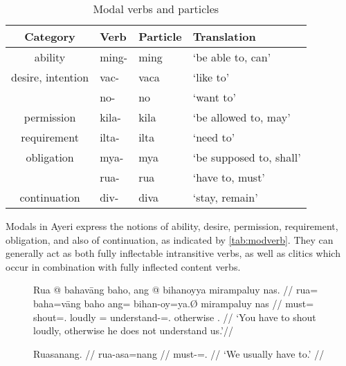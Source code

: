 \begin{table}
\caption{Modal verbs and particles}
\begin{tabu} to \linewidth {C[3] I[2] I[2] X[4]}
\tableheaderfont\toprule
Category
	& Verb
	& Particle
	& Translation
	\\
\toprule

ability
	& ming- %
	& ming %
	& `be able to, can'
	\\
	
\midrule
	
desire, intention
	& vac- %
	& vaca %
	& `like to'
	\\
	
	& no- %
	& no %
	& `want to'
	\\
	
\midrule

permission
	& kila- %
	& kila %
	& `be allowed to, may'
	\\
	
\midrule

requirement
	& ilta- %
	& ilta %
	& `need to'
	\\
	
\midrule

obligation
	& mya- %
	& mya %
	& `be supposed to, shall'
	\\
	
	& rua- %
	& rua %
	& `have to, must'
	\\
	
\midrule
	
continuation
	& div- %
	& diva %
	& `stay, remain'
	\\

\bottomrule
\end{tabu}
\label{tab:modverb}
\end{table}

Modals in Ayeri express the notions of ability, desire, permission,
requirement, obligation, and also of continuation, as indicated by
\autoref{tab:modverb}. They can generally act as both fully inflectable
intransitive verbs, as well as clitics which occur in combination with fully
inflected content verbs.

\begin{figure}[h]
\pex
\a\label{ex:modalinvar}\begingl
	\gla Rua @ bahavāng baho, ang @ bihanoyya mirampaluy nas. //
	\glb rua= baha=vāng baho ang= bihan-oy=ya.Ø mirampaluy nas //
	\glc must= shout=\Second{}.\Aarg{} loudly \AgtT{}= 
		understand-\Neg{}=\TsgM{}.\Top{} otherwise \Fpl{}.\Parg{} //
	\glft `You have to shout loudly, otherwise he does not understand 
		us.'//
\endgl

\a\label{ex:modalinfl}\begingl
	\gla Ruasanang. //
	\glb rua-asa=nang //
	\glc must-\Hab{}=\Fpl{}.\Aarg{} //
	\glft `We usually have to.' //
\endgl
\xe
\end{figure}

